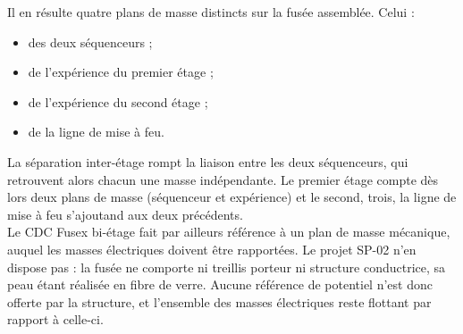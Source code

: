 Il en résulte quatre plans de masse distincts sur la fusée assemblée. Celui :
\begin{itemize}
    \item des deux séquenceurs ;
    \item de l'expérience du premier étage ;
    \item de l'expérience du second étage ;
    \item de la ligne de mise à feu.
\end{itemize}
La séparation inter-étage rompt la liaison entre les deux séquenceurs, qui retrouvent alors chacun une masse indépendante. Le
premier étage compte dès lors deux plans de masse (séquenceur et expérience) et le second, trois, la ligne de mise à feu s'ajoutand
aux deux précédents.\\

Le \acrshort{CDC} Fusex bi-étage fait par ailleurs référence à un plan de masse mécanique, auquel les masses électriques doivent
être rapportées. Le projet SP-02 n'en dispose pas : la fusée ne comporte ni treillis porteur ni structure conductrice, sa peau étant
réalisée en fibre de verre. Aucune référence de potentiel n'est donc offerte par la structure, et l'ensemble des masses électriques
reste flottant par rapport à celle-ci.
